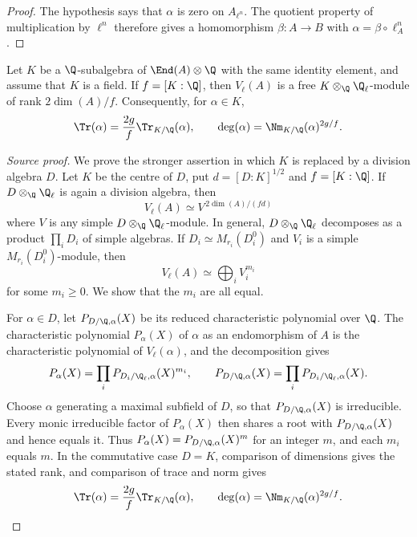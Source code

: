 \begin{proof}
The hypothesis says that $\alpha$ is zero on $A_{\ell^n}$.  The quotient
property of multiplication by $\ell^n$ therefore gives a homomorphism
$\beta:A\to B$ with $\alpha=\beta\circ\ell_A^n$.
\end{proof}

\begin{proposition}
\label{prop:milne-endomorphism-field-characteristic}

Let $K$ be a $\Q$-subalgebra of $\End(A)\otimes\Q$ with the same identity
element, and assume that $K$ is a field.  If $f=[K:\Q]$, then $V_\ell(A)$ is
a free $K\otimes_\Q\Q_\ell$-module of rank $2\dim(A)/f$.  Consequently, for
$\alpha\in K$,
\[
\Tr(\alpha)=\frac{2g}{f}\Tr_{K/\Q}(\alpha),
\qquad
\deg(\alpha)=\Nm_{K/\Q}(\alpha)^{2g/f}.
\]
\end{proposition}

\begin{proof}[Source proof]
We prove the stronger assertion in which $K$ is replaced by a division
algebra $D$.  Let $K$ be the centre of $D$, put
$d=[D:K]^{1/2}$ and $f=[K:\Q]$.  If $D\otimes_\Q\Q_\ell$ is again a division
algebra, then
\[
V_\ell(A)\simeq V^{\,2\dim(A)/(f d)}
\]
where $V$ is any simple $D\otimes_\Q\Q_\ell$-module.  In general,
$D\otimes_\Q\Q_\ell$ decomposes as a product $\prod_iD_i$ of simple
algebras.  If $D_i\simeq M_{r_i}(D_i^0)$ and $V_i$ is a simple
$M_{r_i}(D_i^0)$-module, then
\[
V_\ell(A)\simeq\bigoplus_i V_i^{m_i}
\]
for some $m_i\geq0$.  We show that the $m_i$ are all equal.

For $\alpha\in D$, let $P_{D/\Q,\alpha}(X)$ be its reduced
characteristic polynomial over $\Q$.  The characteristic polynomial
$P_\alpha(X)$ of $\alpha$ as an endomorphism of $A$ is the characteristic
polynomial of $V_\ell(\alpha)$, and the decomposition gives
\[
P_\alpha(X)=\prod_iP_{D_i/\Q_\ell,\alpha}(X)^{m_i},
\qquad
P_{D/\Q,\alpha}(X)=\prod_iP_{D_i/\Q_\ell,\alpha}(X).
\]
Choose $\alpha$ generating a maximal subfield of $D$, so that
$P_{D/\Q,\alpha}(X)$ is irreducible.  Every monic irreducible factor of
$P_\alpha(X)$ then shares a root with $P_{D/\Q,\alpha}(X)$ and hence equals
it.  Thus $P_\alpha(X)=P_{D/\Q,\alpha}(X)^m$ for an integer $m$, and each
$m_i$ equals $m$.  In the commutative case $D=K$, comparison of dimensions
gives the stated rank, and comparison of trace and norm gives
\[
\Tr(\alpha)=\frac{2g}{f}\Tr_{K/\Q}(\alpha),\qquad
\deg(\alpha)=\Nm_{K/\Q}(\alpha)^{2g/f}.
\]
\end{proof}


